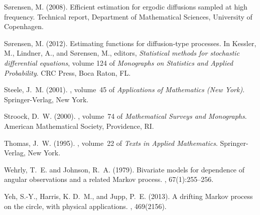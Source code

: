 \documentclass[oneside,11pt]{article}
\begin{document}
\begin{thebibliography}{}
	S{\o}rensen, M. (2008).
	\newblock Efficient estimation for ergodic diffusions sampled at high
	frequency.
	\newblock Technical report, Department of Mathematical Sciences, University of
	Copenhagen.
	
	S{\o}rensen, M. (2012).
	\newblock Estimating functions for diffusion-type processes.
	\newblock In Kessler, M., Lindner, A., and S{\o}rensen, M., editors, {\em
		Statistical methods for stochastic differential equations}, volume 124 of
	{\em Monographs on Statistics and Applied Probability}. CRC Press, Boca
	Raton, FL.
	
	Steele, J.~M. (2001).
	, volume~45 of
	{\em Applications of Mathematics (New York)}.
	\newblock Springer-Verlag, New York.
	
	Stroock, D.~W. (2000).
	, volume~74 of {\em Mathematical Surveys and Monographs}.
	\newblock American Mathematical Society, Providence, RI.
	
	Thomas, J.~W. (1995).
	, volume~22 of {\em Texts in Applied Mathematics}.
	\newblock Springer-Verlag, New York.
	
	Wehrly, T.~E. and Johnson, R.~A. (1979).
	\newblock Bivariate models for dependence of angular observations and a related
	{M}arkov process.
	, 67(1):255--256.
	
	Yeh, S.-Y., Harris, K. D.~M., and Jupp, P.~E. (2013).
	\newblock A drifting Markov process on the circle, with physical applications.
	, 469(2156).
	
\end{thebibliography}
\end{document}
